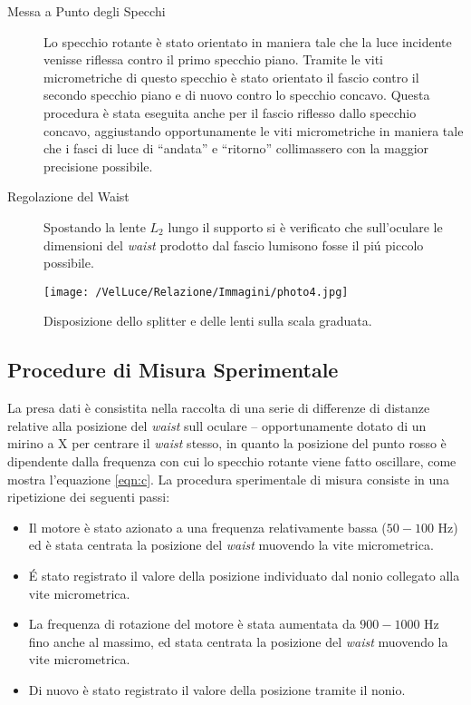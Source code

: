 \documentclass[a4paper,11pt]{article}
\newcommand{\virgolette}[1]{``#1''}
\begin{document}
\begin{description}
	\item[Messa a Punto degli Specchi] Lo specchio rotante è stato orientato in maniera tale che la luce incidente venisse riflessa contro il primo specchio piano. Tramite le viti micrometriche di questo specchio è stato orientato il fascio contro il secondo specchio piano e di nuovo contro lo specchio concavo. Questa procedura è stata eseguita anche per il fascio riflesso dallo specchio concavo, aggiustando opportunamente le viti micrometriche in maniera tale che i fasci di luce di \virgolette{andata} e \virgolette{ritorno} collimassero con la maggior precisione possibile.
	\item[Regolazione del Waist] Spostando la lente $L_2$ lungo il supporto si è verificato che sull'oculare le dimensioni del \textit{waist} prodotto dal fascio lumisono fosse il pi\'u piccolo possibile.
\end{description}

\begin{figure}[h]
		\centering
		\texttt{[image: /VelLuce/Relazione/Immagini/photo4.jpg]}    
		\caption{Disposizione dello splitter e delle lenti sulla scala graduata.}\label{photo4}
	\end{figure}
\subsection{Procedure di Misura Sperimentale}



La presa dati è consistita nella raccolta di una serie di differenze di distanze relative alla posizione del \textit{waist} sull oculare  -- opportunamente dotato di un mirino a X per centrare il \textit{waist} stesso, in quanto la posizione del punto rosso è dipendente dalla frequenza con cui lo specchio rotante viene fatto oscillare, come mostra l'equazione \ref{eqn:c}. La procedura sperimentale di misura consiste in una ripetizione dei seguenti passi:

\begin{itemize}
	\item Il motore è stato azionato a una frequenza relativamente bassa ($50-100$ Hz) ed è stata centrata la posizione del \textit{waist} muovendo la vite micrometrica.
	\item \'E stato registrato il valore della posizione individuato dal nonio collegato alla vite micrometrica.
	\item La frequenza di rotazione del motore è stata aumentata da $900-1000$ Hz fino anche al massimo, ed stata centrata la posizione del \textit{waist} muovendo la vite micrometrica.
	\item Di nuovo è stato registrato il valore della posizione tramite il nonio.
\end{itemize}
\end{document}
